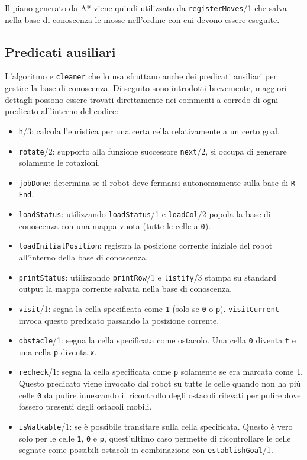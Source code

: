 Il piano generato da A* viene quindi utilizzato da \texttt{registerMoves}/1 che salva nella base di conoscenza le mosse nell'ordine con cui devono essere eseguite.

\subsection{Predicati ausiliari}
L'algoritmo e \texttt{cleaner} che lo usa sfruttano anche dei predicati ausiliari per gestire la base di conoscenza. Di seguito sono introdotti brevemente, maggiori dettagli possono essere trovati direttamente nei commenti a corredo di ogni predicato all'interno del codice:
\begin{itemize}
	\item \texttt{h}/3: calcola l'euristica per una certa cella relativamente a un certo goal.
	\item \texttt{rotate}/2: supporto alla funzione successore \texttt{next}/2, si occupa di generare solamente le rotazioni.
	\item \texttt{jobDone}: determina se il robot deve fermarsi autonomamente sulla base di \texttt{R-End}.
	\item \texttt{loadStatus}: utilizzando \texttt{loadStatus}/1 e \texttt{loadCol}/2 popola la base di conoscenza con una mappa vuota (tutte le celle a \texttt{0}).
	\item \texttt{loadInitialPosition}: registra la posizione corrente iniziale del robot all'interno della base di conoscenza.
	\item \texttt{printStatus}: utilizzando \texttt{printRow}/1 e \texttt{listify}/3 stampa su standard output la mappa corrente salvata nella base di conoscenza.
	\item \texttt{visit}/1: segna la cella specificata come \texttt{1} (solo se \texttt{0} o \texttt{p}). \texttt{visitCurrent} invoca questo predicato passando la posizione corrente.
	\item \texttt{obstacle}/1: segna la cella specificata come ostacolo. Una cella \texttt{0} diventa \texttt{t} e una cella \texttt{p} diventa \texttt{x}.
	\item \texttt{recheck}/1: segna la cella specificata come \texttt{p} solamente se era marcata come \texttt{t}. Questo predicato viene invocato dal robot su tutte le celle quando non ha più celle \texttt{0} da pulire innescando il ricontrollo degli ostacoli rilevati per pulire dove fossero presenti degli ostacoli mobili.
	\item \texttt{isWalkable}/1: se è possibile transitare sulla cella specificata. Questo è vero solo per le celle \texttt{1}, \texttt{0} e \texttt{p}, quest'ultimo caso permette di ricontrollare le celle segnate come possibili ostacoli in combinazione con \texttt{establishGoal}/1.

\end{itemize}
